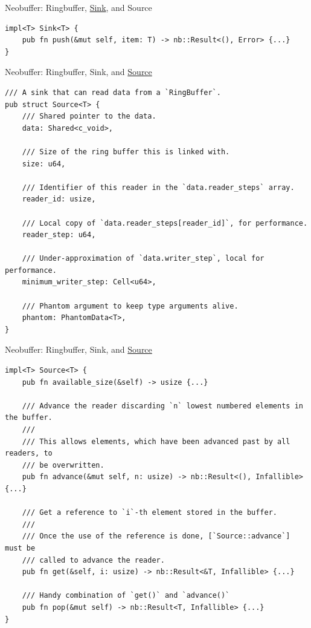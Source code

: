 \documentclass[aspectratio=43]{beamer}
\begin{document}
\begin{frame}[fragile]{Neobuffer: Ringbuffer, \underline{Sink}, and Source}
    \begin{verbatim}
impl<T> Sink<T> {
    pub fn push(&mut self, item: T) -> nb::Result<(), Error> {...}
}
    \end{verbatim}
\end{frame}

\begin{frame}[fragile]{Neobuffer: Ringbuffer, Sink, and \underline{Source}}
    \begin{verbatim}
/// A sink that can read data from a `RingBuffer`.
pub struct Source<T> {
    /// Shared pointer to the data.
    data: Shared<c_void>,

    /// Size of the ring buffer this is linked with.
    size: u64,

    /// Identifier of this reader in the `data.reader_steps` array.
    reader_id: usize,

    /// Local copy of `data.reader_steps[reader_id]`, for performance.
    reader_step: u64,

    /// Under-approximation of `data.writer_step`, local for performance.
    minimum_writer_step: Cell<u64>,

    /// Phantom argument to keep type arguments alive.
    phantom: PhantomData<T>,
}
    \end{verbatim}
\end{frame}

\begin{frame}[fragile]{Neobuffer: Ringbuffer, Sink, and \underline{Source}}
    \begin{verbatim}
impl<T> Source<T> {
    pub fn available_size(&self) -> usize {...}

    /// Advance the reader discarding `n` lowest numbered elements in the buffer.
    ///
    /// This allows elements, which have been advanced past by all readers, to
    /// be overwritten.
    pub fn advance(&mut self, n: usize) -> nb::Result<(), Infallible> {...}

    /// Get a reference to `i`-th element stored in the buffer.
    ///
    /// Once the use of the reference is done, [`Source::advance`] must be
    /// called to advance the reader.
    pub fn get(&self, i: usize) -> nb::Result<&T, Infallible> {...}

    /// Handy combination of `get()` and `advance()`
    pub fn pop(&mut self) -> nb::Result<T, Infallible> {...}
}
    \end{verbatim}
\end{frame}
\end{document}
